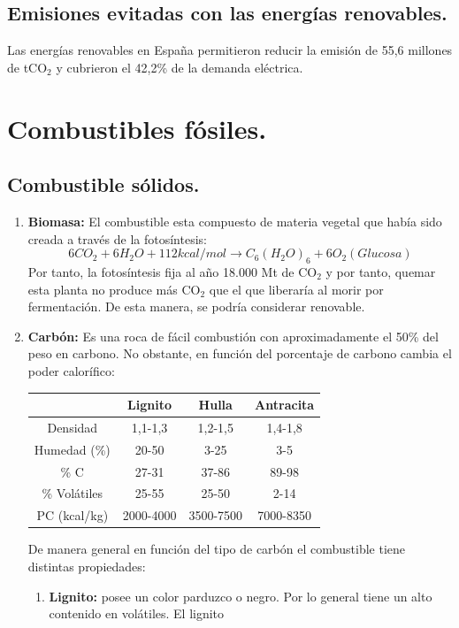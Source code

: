\subsection{Emisiones evitadas con las energías renovables.}
Las energías renovables en España permitieron reducir la emisión de 55,6 millones de tCO$_2$ y cubrieron el 42,2\% de la demanda eléctrica.
\newpage
\section{Combustibles fósiles.}
\subsection{Combustible sólidos.}
\begin{enumerate}
	\item \textbf{Biomasa:}
		El combustible esta compuesto de materia vegetal que había sido creada a través de la fotosíntesis:
		\[6 CO_2 + 6 H_2O + 112 kcal/mol \rightarrow C_6 (H_2O)_6 + 6 O_2 ( Glucosa)\]
		Por tanto, la fotosíntesis fija al año 18.000 Mt de CO$_2$ y por tanto, quemar esta planta no produce más CO$_2$ que el que liberaría al morir por fermentación. De esta manera, se podría considerar renovable.
	\item \textbf{Carbón:}
		Es una roca de fácil combustión con aproximadamente el 50\% del peso en carbono. No obstante, en función del porcentaje de carbono cambia el poder calorífico:
		\begin{table}[H]
			\centering
			\renewcommand{\arraystretch}{1.1}
			\begin{tabular}{cccc}
				\hline
				&\textbf{Lignito} & \textbf{Hulla} & \textbf{Antracita}\\  
				\hline
			Densidad &  1,1-1,3&1,2-1,5  &1,4-1,8\\ 
			Humedad (\%) &20-50  &3-25  &3-5\\ 
			\% C & 27-31 &  37-86&89-98\\ 
			\% Volátiles &25-55  &25-50  &2-14\\ 
			PC (kcal/kg) &  2000-4000&3500-7500  &7000-8350\\ 
				\hline
			\end{tabular}
		\end{table}
		De manera general en función del tipo de carbón el combustible tiene distintas propiedades:
		\begin{enumerate}
			\item \textbf{Lignito:}
			posee un color parduzco o negro. Por lo general tiene un alto contenido en volátiles. El lignito

\end{enumerate}
\end{enumerate}
